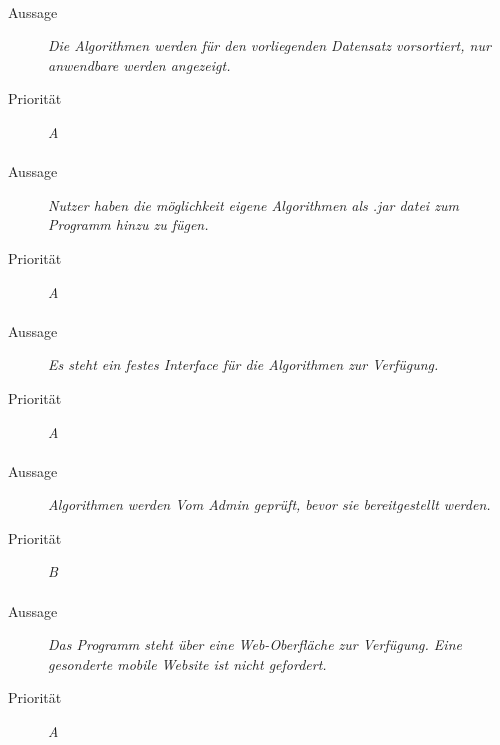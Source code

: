\paragraph{}
\begin{description}
\item[Aussage] \textit{Die Algorithmen werden für den vorliegenden Datensatz vorsortiert, nur anwendbare werden angezeigt.}
\item[Priorität] \textit{A}
\end{description}

\paragraph{}
\begin{description}
\item[Aussage] \textit{Nutzer haben die möglichkeit eigene Algorithmen als .jar datei zum Programm hinzu zu fügen.}
\item[Priorität] \textit{A}
\end{description}

\paragraph{}
\begin{description}
\item[Aussage] \textit{Es steht ein festes Interface für die Algorithmen zur Verfügung.}
\item[Priorität] \textit{A}
\end{description}

\paragraph{}
\begin{description}
\item[Aussage] \textit{Algorithmen werden Vom Admin geprüft, bevor sie bereitgestellt werden.}
\item[Priorität] \textit{B}
\end{description}

\paragraph{}
\begin{description}
\item[Aussage] \textit{Das Programm steht über eine Web-Oberfläche zur Verfügung. Eine gesonderte mobile Website ist nicht gefordert.}
\item[Priorität] \textit{A}
\end{description}

